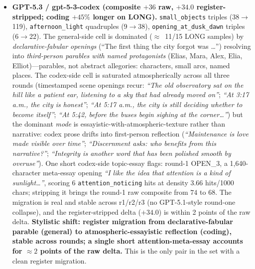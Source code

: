 \documentclass[11pt,a4paper]{article}
\begin{document}
\begin{sloppypar}
\begin{itemize}[leftmargin=2em, itemsep=0.3em, topsep=0.3em]
\item \textbf{GPT-5.3 / gpt-5-3-codex (composite $+36$ raw, $+34.0$ register-stripped; coding $+45\%$ longer on LONG).} \texttt{small\_objects} triples (38$\rightarrow$119), \texttt{afternoon\_light} quadruples (9$\rightarrow$38), \texttt{opening\_at\_dusk\_dawn} triples (6$\rightarrow$22). The general-side cell is dominated ($\approx$~11/15 LONG samples) by \emph{declarative-fabular openings} (``The first thing the city forgot was \ldots'') resolving into \emph{third-person parables with named protagonists} (Elias, Mara, Alex, Elia, Elliot)---parables, not abstract allegories: characters, small arcs, named places. The codex-side cell is saturated atmospherically across all three rounds (timestamped scene openings recur: \emph{``The old observatory sat on the hill like a patient ear, listening to a sky that had already moved on''}; \emph{``At 3:17 a.m., the city is honest''}; \emph{``At 5:17 a.m., the city is still deciding whether to become itself''}; \emph{``At 5:42, before the buses begin sighing at the corner\ldots''}) but the dominant \emph{mode} is essayistic-with-atmospheric-texture rather than narrative: codex prose drifts into first-person reflection (\emph{``Maintenance is love made visible over time''}; \emph{``Discernment asks: who benefits from this narrative?''}; \emph{``Integrity is another word that has been polished smooth by overuse''}). One short codex-side topic-essay flags: round-1 OPEN\_3, a 1{,}640-character meta-essay opening \emph{``I like the idea that attention is a kind of sunlight\ldots''}, scoring 6 \texttt{attention\allowbreak\_noticing} hits at density 3.66 hits/1000 chars; stripping it brings the round-1 raw composite from $74$ to $68$. The migration is real and stable across r1/r2/r3 (no GPT-5.1-style round-one collapse), and the register-stripped delta ($+34.0$) is within 2 points of the raw delta. \textbf{Stylistic shift: register migration from declarative-fabular parable (general) to atmospheric-essayistic reflection (coding), stable across rounds; a single short attention-meta-essay accounts for $\approx 2$ points of the raw delta.} This is the only pair in the set with a clean register migration.
\end{itemize}
\end{sloppypar}
\end{document}
